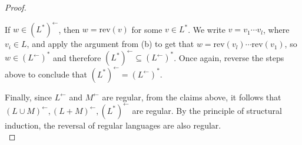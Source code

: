 \documentclass[11pt]{article}
\begin{document}
\begin{proof}
\begin{enumerate}[label=(\alph*)]
            If \(w \in (L^*)^\leftarrow\), then \(w = \mathrm{rev} (v)\) for some \(v \in L^*\). We write \(v = v_1 \cdots v_l\), where \(v_i \in L\), and apply the argument from (b) to get that \(w = \mathrm{rev} (v_l) \cdots \mathrm{rev} (v_1)\), so \(w \in (L^\leftarrow)^*\) and therefore \((L^*)^\leftarrow \subseteq (L^\leftarrow)^*\). Once again, reverse the steps above to conclude that \((L^*)^\leftarrow = (L^\leftarrow)^*\).
        \end{enumerate}
        Finally, since \(L^\leftarrow\) and \(M^\leftarrow\) are regular, from the claims above, it follows that \((L \cup M)^\leftarrow, (L + M)^\leftarrow, (L^*)^\leftarrow\) are regular. By the principle of structural induction, the reversal of regular languages are also regular. \\
    \end{proof}
\end{document}
